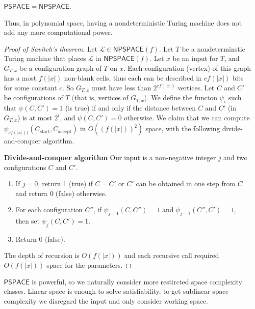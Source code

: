 \begin{corollary}[]
	$
		\mathsf{PSPACE} = \mathsf{NPSPACE}
	$.
\end{corollary}

Thus, in polynomial space, having a nondeterministic Turing machine does
not add any more computational power.
\begin{proof}[Proof of Savitch's theorem]
	Let $\mathcal L \in \mathsf{NPSPACE}\left( 
		f 
	\right)$.
	Let $T$ be a nondeterminstic Turing machine that places $\mathcal L$
	in $\mathsf{NPSPACE}(f)$.
	Let $x$ be an input for $T$,
	and $G_{T,x}$ be a configuration graph of $T$ on $x$.
	Each configuration (vertex) of this graph has a most
	$
		f\left( 
			\left\lvert x \right\rvert 
		\right)
	$
	non-blank cells, thus each can be described in $c f\left( 
		\left\lvert x \right\rvert 
	\right)$ bits for some constant $c$.
	So $G_{T,x}$ must have less than $2^{cf\left( 
		\left\lvert x \right\rvert 
	\right)}$ vertices.
	Let $C$ and $C'$ be configurations of $T$ (that is, vertices of $G_{T,x}$).
	We define the functon $\psi_i$
	such that $\psi(C,C') = 1$ (is true) if and only if 
	the distance between $C$ and $C'$ (in $G_{T,x}$)
	is at most $2^i$, and $\psi(C,C') = 0$ otherwise.
	We claim that we can compute
	$
		\psi_{cf\left( 
			\left\lvert x \right\rvert 
		\right))}(C_\text{start}, C_\text{accept})
	$
	in
	$
	 O\left( 
		\left(
			f\left( 
				\left\lvert x \right\rvert 
			\right) 
		\right)^2
	 \right)
	$
	space, with the following divide-and-conquer algorithm.

	\textbf{Divide-and-conquer algorithm}
	Our input is a non-negative integer $j$ and two configurations
	$C$ and $C'$.
	\begin{enumerate}
		\item If $j = 0$, return 1 (true) if $C = C'$
			or $C'$ can be obtained in one step from $C$
			and return 0 (false) otherwise.
		\item For each configuration $C''$,
			if $\psi_{j-1}(C,C'') = 1$ and
			$\psi_{j-1}(C'',C') = 1$, then set 
			$\psi_{j}(C,C') = 1$.
		\item Return 0 (false).
	\end{enumerate}
	The depth of recursion is
	$
	O\left( 
		f\left( 
			\left\lvert x \right\rvert 
		\right) 
	\right)
	$
	and each recursive call required
	$
	O\left( 
		f\left( 
			\left\lvert x \right\rvert 
		\right) 
	\right)
	$
	space for the parameters.
\end{proof}

$\mathsf{PSPACE}$ is powerful, so we naturally consider more restircted
space complexity classes.
Linear space is enough to solve satisfiability, to get sublinear space
complexity we disregard the input and only consider working space.

